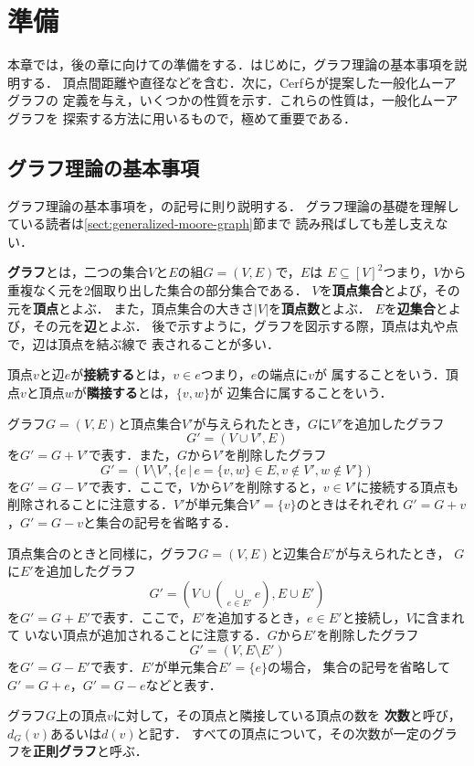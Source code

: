 
\chapter{準備}
\label{chap:preliminary}
本章では，後の章に向けての準備をする．はじめに，グラフ理論の基本事項を説明する．
頂点間距離や直径などを含む．次に，Cerfらが提案した一般化ムーアグラフの
定義を与え，いくつかの性質を示す．これらの性質は，一般化ムーアグラフを
探索する方法に用いるもので，極めて重要である．

\section{グラフ理論の基本事項}
\label{sect:basic-graph-theory}
グラフ理論の基本事項を，\cite{Diestel2000}の記号に則り説明する．
グラフ理論の基礎を理解している読者は\ref{sect:generalized-moore-graph}節まで
読み飛ばしても差し支えない．

\textbf{グラフ}とは，二つの集合$V$と$E$の組$G=(V,E)$で，$E$は
$E\subseteq[V]^2$つまり，$V$から重複なく元を2個取り出した集合の部分集合である．
$V$を\textbf{頂点集合}とよび，その元を\textbf{頂点}とよぶ．
また，頂点集合の大きさ$|V|$を\textbf{頂点数}とよぶ．
$E$を\textbf{辺集合}とよび，その元を\textbf{辺}とよぶ．
後で示すように，グラフを図示する際，頂点は丸や点で，辺は頂点を結ぶ線で
表されることが多い．

頂点$v$と辺$e$が\textbf{接続する}とは，$v\in e$つまり，$e$の端点に$v$が
属することをいう．頂点$v$と頂点$w$が\textbf{隣接する}とは，$\{v,w\}$が
辺集合に属することをいう．

グラフ$G=(V,E)$と頂点集合$V'$が与えられたとき，$G$に$V'$を追加したグラフ
\[ G'=(V\cup V',E) \]
を$G'=G+V'$で表す．また，$G$から$V'$を削除したグラフ
\[ G'=(V\setminus V',\{e\,|\,e=\{v,w\}\in E,v\notin V',w\notin V'\}) \]
を$G'=G-V'$で表す．ここで，$V$から$V'$を削除すると，$v\in V'$に接続する頂点も
削除されることに注意する．$V'$が単元集合$V'=\{v\}$のときはそれぞれ
$G'=G+v$，$G'=G-v$と集合の記号を省略する．

頂点集合のときと同様に，グラフ$G=(V,E)$と辺集合$E'$が与えられたとき，
$G$に$E'$を追加したグラフ
\[ G'=(V\cup(\underset{e\in E'}{\cup}e),E\cup E') \]
を$G'=G+E'$で表す．ここで，$E'$を追加するとき，$e\in E'$と接続し，$V$に含まれて
いない頂点が追加されることに注意する．$G$から$E'$を削除したグラフ
\[ G'=(V,E\setminus E') \]
を$G'=G-E'$で表す．$E'$が単元集合$E'=\{e\}$の場合，
集合の記号を省略して$G'=G+e$，$G'=G-e$などと表す．

グラフ$G$上の頂点$v$に対して，その頂点と隣接している頂点の数を
\textbf{次数}と呼び，$d_G(v)$あるいは$d(v)$と記す．
すべての頂点について，その次数が一定のグラフを\textbf{正則グラフ}と呼ぶ．

